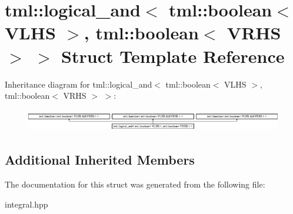 \hypertarget{structtml_1_1logical__and_3_01tml_1_1boolean_3_01VLHS_01_4_00_01tml_1_1boolean_3_01VRHS_01_4_01_4}{\section{tml\+:\+:logical\+\_\+and$<$ tml\+:\+:boolean$<$ V\+L\+H\+S $>$, tml\+:\+:boolean$<$ V\+R\+H\+S $>$ $>$ Struct Template Reference}
\label{structtml_1_1logical__and_3_01tml_1_1boolean_3_01VLHS_01_4_00_01tml_1_1boolean_3_01VRHS_01_4_01_4}
}
Inheritance diagram for tml\+:\+:logical\+\_\+and$<$ tml\+:\+:boolean$<$ V\+L\+H\+S $>$, tml\+:\+:boolean$<$ V\+R\+H\+S $>$ $>$\+:\begin{figure}[H]
\begin{center}
\leavevmode
\includegraphics[height=0.967185cm]{structtml_1_1logical__and_3_01tml_1_1boolean_3_01VLHS_01_4_00_01tml_1_1boolean_3_01VRHS_01_4_01_4}
\end{center}
\end{figure}
\subsection*{Additional Inherited Members}


The documentation for this struct was generated from the following file\+:\begin{DoxyCompactItemize}
\item 
integral.\+hpp\end{DoxyCompactItemize}
